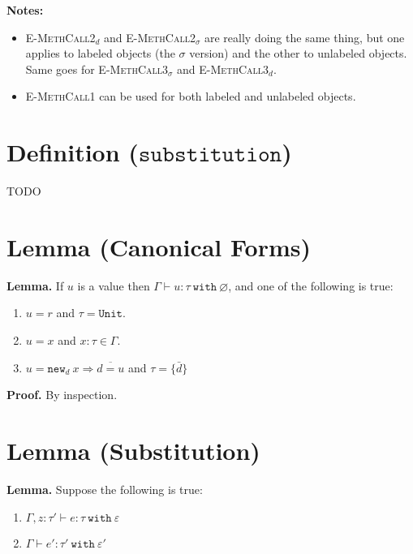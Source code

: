 \documentclass{llncs}
\newcommand{\keywadj}[1]{\mathtt{#1}}
\newcommand{\keyw}[1]{\keywadj{#1}~}
\newcommand{\kwa}[1]{\keywadj{ #1 }}
\newcommand{\type}[2]{
	#1~\keyw{with} #2
}
\newcommand{\newd}[0]{
	\keywadj{new}_d~x \Rightarrow \overline{d = u}
}
\begin{document}
\noindent \textbf{Notes:}
\begin{itemize}
	\item \textsc{E-MethCall2$_d$} and \textsc{E-MethCall2$_\sigma$} are really doing the same thing, but one applies to labeled objects (the $\sigma$ version) and the other to unlabeled objects. Same goes for \textsc{E-MethCall3$_\sigma$} and \textsc{E-MethCall3$_d$}.
	\item \textsc{E-MethCall1} can be used for both labeled and unlabeled objects.
\end{itemize}


\section{Definition ($\keywadj{substitution}$)}

TODO










\section{Lemma (Canonical Forms)}

\textbf{Lemma. } If $u$ is a value then $\Gamma \vdash u : \type{\tau}{\varnothing}$, and one of the following is true:
\begin{enumerate}
	\item $u = r$ and $\tau = \kwa{Unit}$.
	\item $u = x$ and $x : \tau \in \Gamma$.
	\item $u = \newd$ and $\tau = \{ \bar d \}$ 
\end{enumerate} 

\noindent
\textbf{Proof.} By inspection.








\section{Lemma (Substitution)}

\textbf{Lemma. } Suppose the following is true: 

\begin{enumerate}
	\item $\Gamma, z : \tau' \vdash e : \tau~\keyw{with} \varepsilon$
	\item $\Gamma \vdash e' : \tau'~\keyw{with} \varepsilon'$
\end{enumerate}
	
\end{document}
